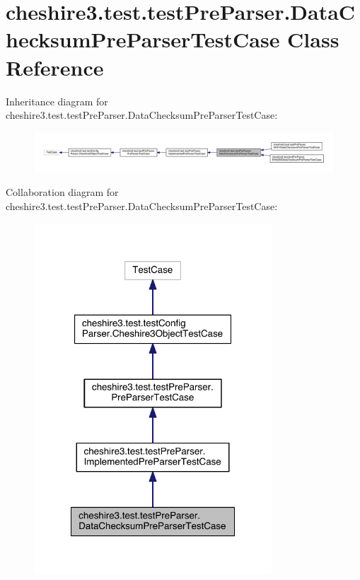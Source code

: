 \hypertarget{classcheshire3_1_1test_1_1test_pre_parser_1_1_data_checksum_pre_parser_test_case}{\section{cheshire3.\-test.\-test\-Pre\-Parser.\-Data\-Checksum\-Pre\-Parser\-Test\-Case Class Reference}
\label{classcheshire3_1_1test_1_1test_pre_parser_1_1_data_checksum_pre_parser_test_case}
}


Inheritance diagram for cheshire3.\-test.\-test\-Pre\-Parser.\-Data\-Checksum\-Pre\-Parser\-Test\-Case\-:
\nopagebreak
\begin{figure}[H]
\begin{center}
\leavevmode
\includegraphics[width=350pt]{classcheshire3_1_1test_1_1test_pre_parser_1_1_data_checksum_pre_parser_test_case__inherit__graph}
\end{center}
\end{figure}


Collaboration diagram for cheshire3.\-test.\-test\-Pre\-Parser.\-Data\-Checksum\-Pre\-Parser\-Test\-Case\-:
\nopagebreak
\begin{figure}[H]
\begin{center}
\leavevmode
\includegraphics[width=252pt]{classcheshire3_1_1test_1_1test_pre_parser_1_1_data_checksum_pre_parser_test_case__coll__graph}
\end{center}
\end{figure}
